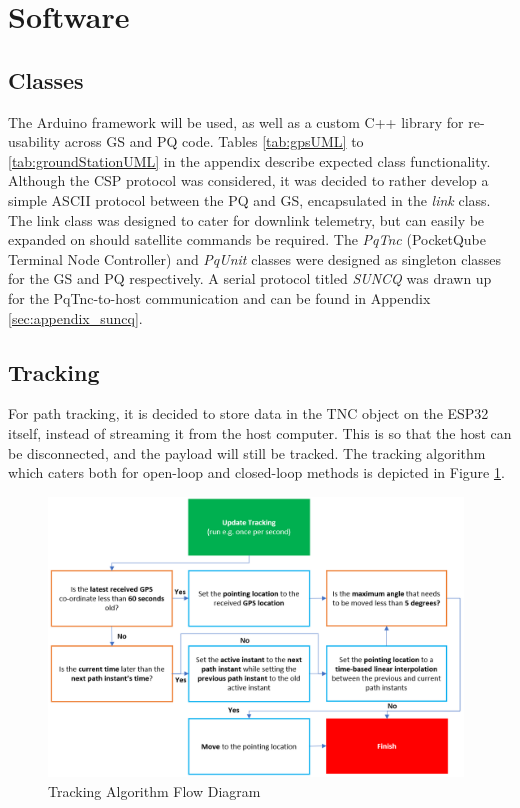\graphicspath{{./figures}}

\section{Software}

\subsection{Classes}
The Arduino framework will be used, as well as a custom C++ library for re-usability across GS and PQ code. Tables \ref{tab:gpsUML} to \ref{tab:groundStationUML} in the appendix describe expected class functionality. Although the CSP protocol was considered, it was decided to rather develop a simple ASCII protocol between the PQ and GS, encapsulated in the \textit{link} class. The link class was designed to cater for downlink telemetry, but can easily be expanded on should satellite commands be required. The \textit{PqTnc} (PocketQube Terminal Node Controller) and \textit{PqUnit} classes were designed as singleton classes for the GS and PQ respectively. A serial protocol titled \textit{SUNCQ} was drawn up for the PqTnc-to-host communication and can be found in Appendix \ref{sec:appendix_suncq}.

\subsection{Tracking}
For path tracking, it is decided to store data in the TNC object on the ESP32 itself, instead of streaming it from the host computer. This is so that the host can be disconnected, and the payload will still be tracked. The tracking algorithm which caters both for open-loop and closed-loop methods is depicted in Figure \ref{fig:trackingAlgorithm}.

\begin{figure}[!htb]
  \centering
  \includegraphics[width=0.98\textwidth]{trackingAlgorithm}
  \caption{Tracking Algorithm Flow Diagram}
  \label{fig:trackingAlgorithm}
\end{figure}